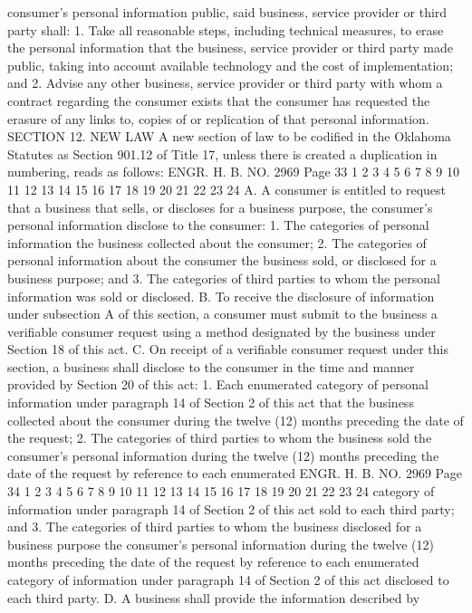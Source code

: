 consumer's personal information public, said business, service
provider or third party shall:
1. Take all reasonable steps, including technical measures, to
erase the personal information that the business, service provider
or third party made public, taking into account available technology
and the cost of implementation; and
2. Advise any other business, service provider or third party
with whom a contract regarding the consumer exists that the consumer
has requested the erasure of any links to, copies of or replication
of that personal information.
SECTION 12. NEW LAW A new section of law to be codified
in the Oklahoma Statutes as Section 901.12 of Title 17, unless there
is created a duplication in numbering, reads as follows:
ENGR. H. B. NO. 2969 Page 33
1
2
3
4
5
6
7
8
9
10
11
12
13
14
15
16
17
18
19
20
21
22
23
24
A. A consumer is entitled to request that a business that
sells, or discloses for a business purpose, the consumer's personal
information disclose to the consumer:
1. The categories of personal information the business
collected about the consumer;
2. The categories of personal information about the consumer
the business sold, or disclosed for a business purpose; and
3. The categories of third parties to whom the personal
information was sold or disclosed.
B. To receive the disclosure of information under subsection A
of this section, a consumer must submit to the business a verifiable
consumer request using a method designated by the business under
Section 18 of this act.
C. On receipt of a verifiable consumer request under this
section, a business shall disclose to the consumer in the time and
manner provided by Section 20 of this act:
1. Each enumerated category of personal information under
paragraph 14 of Section 2 of this act that the business collected
about the consumer during the twelve (12) months preceding the date
of the request;
2. The categories of third parties to whom the business sold
the consumer's personal information during the twelve (12) months
preceding the date of the request by reference to each enumerated 
ENGR. H. B. NO. 2969 Page 34
1
2
3
4
5
6
7
8
9
10
11
12
13
14
15
16
17
18
19
20
21
22
23
24
category of information under paragraph 14 of Section 2 of this act
sold to each third party; and
3. The categories of third parties to whom the business
disclosed for a business purpose the consumer's personal information
during the twelve (12) months preceding the date of the request by
reference to each enumerated category of information under paragraph
14 of Section 2 of this act disclosed to each third party.
D. A business shall provide the information described by
